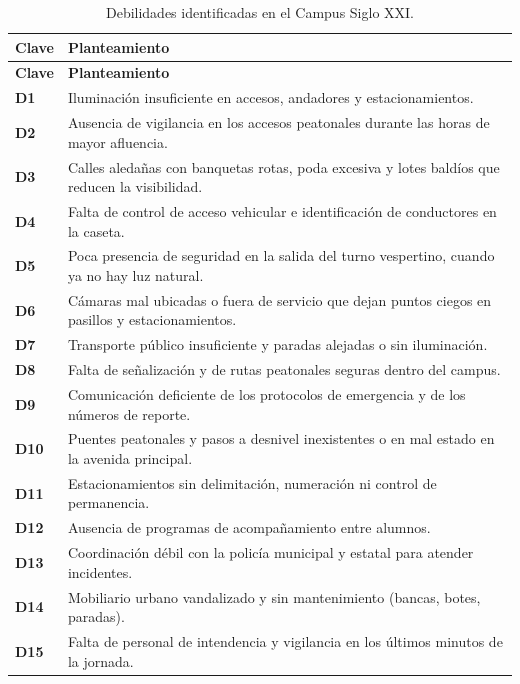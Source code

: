 \documentclass[11pt,a4paper]{article}
\newcommand{\clave}[1]{\textbf{\color{uazblue}#1}}
\begin{document}
{\small\singlespacing
\begin{longtable}{@{}L{1.25cm}L{13.9cm}@{}}
\caption{Debilidades identificadas en el Campus Siglo XXI.}
\label{tab:debilidades}\\
\toprule
\textbf{Clave} & \textbf{Planteamiento} \\
\midrule
\endfirsthead
\toprule
\textbf{Clave} & \textbf{Planteamiento} \\
\midrule
\endhead
\bottomrule
\endfoot
\bottomrule
\endlastfoot
\clave{D1}  & Iluminación insuficiente en accesos, andadores y estacionamientos. \\
\clave{D2}  & Ausencia de vigilancia en los accesos peatonales durante las horas de mayor afluencia. \\
\clave{D3}  & Calles aledañas con banquetas rotas, poda excesiva y lotes baldíos que reducen la visibilidad. \\
\clave{D4}  & Falta de control de acceso vehicular e identificación de conductores en la caseta. \\
\clave{D5}  & Poca presencia de seguridad en la salida del turno vespertino, cuando ya no hay luz natural. \\
\clave{D6}  & Cámaras mal ubicadas o fuera de servicio que dejan puntos ciegos en pasillos y estacionamientos. \\
\clave{D7}  & Transporte público insuficiente y paradas alejadas o sin iluminación. \\
\clave{D8}  & Falta de señalización y de rutas peatonales seguras dentro del campus. \\
\clave{D9}  & Comunicación deficiente de los protocolos de emergencia y de los números de reporte. \\
\clave{D10} & Puentes peatonales y pasos a desnivel inexistentes o en mal estado en la avenida principal. \\
\clave{D11} & Estacionamientos sin delimitación, numeración ni control de permanencia. \\
\clave{D12} & Ausencia de programas de acompañamiento entre alumnos. \\
\clave{D13} & Coordinación débil con la policía municipal y estatal para atender incidentes. \\
\clave{D14} & Mobiliario urbano vandalizado y sin mantenimiento (bancas, botes, paradas). \\
\clave{D15} & Falta de personal de intendencia y vigilancia en los últimos minutos de la jornada. \\
\end{longtable}}
\end{document}
